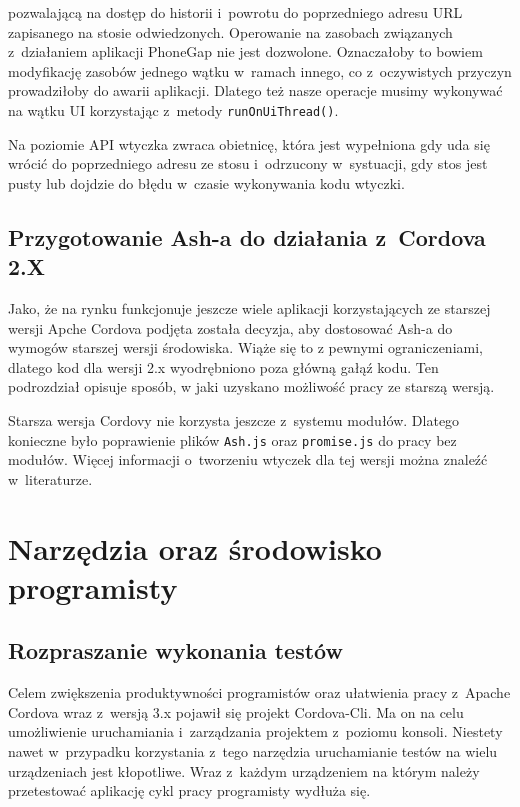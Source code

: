 \documentclass{xmgr}
\begin{document}
\noindent pozwalającą na dostęp do historii i~powrotu do poprzedniego  adresu URL zapisanego na stosie odwiedzonych. Operowanie na zasobach związanych z~działaniem aplikacji PhoneGap nie jest dozwolone. Oznaczałoby to bowiem modyfikację zasobów jednego wątku w~ramach innego, co z~oczywistych przyczyn prowadziłoby do awarii aplikacji. Dlatego też nasze operacje musimy wykonywać na wątku UI korzystając z~metody \texttt{runOnUiThread()}.

Na poziomie API wtyczka zwraca obietnicę, która jest wypełniona gdy uda się wrócić do poprzedniego adresu ze stosu i~odrzucony w~systuacji, gdy stos jest pusty lub dojdzie do błędu w~czasie wykonywania kodu wtyczki.

\section{Przygotowanie Ash-a do działania z~Cordova 2.X}\label{cordova_2.x}

Jako, że na rynku funkcjonuje jeszcze wiele aplikacji korzystających ze starszej wersji Apche Cordova podjęta została decyzja, aby dostosować Ash-a do wymogów starszej wersji środowiska. Wiąże się to z pewnymi ograniczeniami, dlatego kod dla wersji 2.x wyodrębniono poza główną gałąź kodu. Ten podrozdział opisuje sposób, w jaki uzyskano możliwość pracy ze starszą wersją. 

Starsza wersja Cordovy nie korzysta jeszcze z~systemu modułów. Dlatego konieczne było poprawienie plików \texttt{Ash.js} oraz \texttt{promise.js} do pracy bez modułów. Więcej informacji o~tworzeniu wtyczek dla tej wersji można znaleźć w~literaturze\cite{Ghatol-Patel}.

\chapter{Narzędzia oraz środowisko programisty}

\section{Rozpraszanie wykonania testów}

Celem zwiększenia produktywności programistów oraz ułatwienia pracy z~Apache Cordova wraz z~wersją 3.x pojawił się projekt Cordova-Cli. Ma on na celu umożliwienie uruchamiania i~zarządzania projektem z~poziomu konsoli. Niestety nawet w~przypadku korzystania z~tego narzędzia uruchamianie testów na wielu urządzeniach jest kłopotliwe. Wraz z~każdym urządzeniem na którym należy przetestować aplikację cykl pracy programisty wydłuża się.
\end{document}
